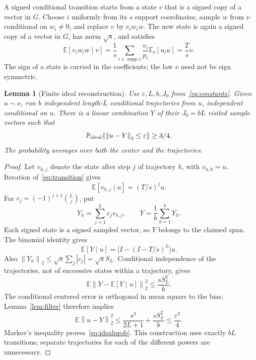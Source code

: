 \documentclass[11pt,a4paper]{article}
\newtheorem{lemma}[theorem]{Lemma}
\theoremstyle{remark}\newtheorem{remark}[theorem]{Remark}
\newcommand{\E}{\mathbb E}
\newcommand{\Prob}{\mathbb P}
\newcommand{\supp}{\operatorname{supp}}
\newcommand{\norm}[1]{\left\lVert #1\right\rVert}
\begin{document}
A signed conditional transition starts from a state $v$ that is a signed copy of a vector in $G$. Choose $i$ uniformly from its $s$ support coordinates, sample $w$ from $\nu$ conditional on $w_i\ne0$, and replace $v$ by $v_iw_iw$. The new state is again a signed copy of a vector in $G$, has norm $\sqrt{s}$, and satisfies
\begin{equation}\label{eq:transition}
 \E[v_iw_iw\mid v]
 =\frac1s\sum_{i\in\supp v}\frac{v_i}{p_i}\E_\nu[u_iu]
 =\frac{T}{s}v.
\end{equation}
The sign of a state is carried in the coefficients; the law $\nu$ need not be sign symmetric.

\begin{lemma}[Finite ideal reconstruction]\label{lem:ideal}
Use $\varepsilon,L,b,J_0$ from~\eqref{eq:constants}. Given $u\sim\nu$, run $b$ independent length-$L$ conditional trajectories from $u$, independent conditional on $u$. There is a linear combination $Y$ of their $J_0=bL$ visited sample vectors such that
\begin{equation}\label{eq:idealprob}
 \Prob_{\rm ideal}\{\norm{u-Y}_2\le\varepsilon\}\ge3/4.
\end{equation}
The probability averages over both the center and the trajectories.
\end{lemma}
\begin{proof}
Let $v_{h,j}$ denote the state after step $j$ of trajectory $h$, with $v_{h,0}=u$. Iteration of~\eqref{eq:transition} gives
\[
 \E[v_{h,j}\mid u]=(T/s)^ju.
\]
For $c_j=(-1)^{j+1}\binom Lj$, put
\[
 Y_h=\sum_{j=1}^Lc_jv_{h,j},\qquad Y=\frac1b\sum_{h=1}^bY_h.
\]
Each signed state is a signed sampled vector, so $Y$ belongs to the claimed span. The binomial identity gives
\[
 \E[Y\mid u]=\big[I-(I-T/s)^L\big]u.
\]
Also $\norm{Y_h}_2\le\sqrt{s}\sum_j|c_j|=\sqrt{s}S_L$. Conditional independence of the trajectories, not of successive states within a trajectory, gives
\[
 \E\norm{Y-\E[Y\mid u]}_2^2\le\frac{sS_L^2}{b}.
\]
The conditional centered error is orthogonal in mean square to the bias. Lemma~\ref{lem:filter} therefore implies
\begin{equation}\label{eq:idealerror}
 \E\norm{u-Y}_2^2
 \le\frac{s^2}{2L+1}+\frac{sS_L^2}{b}
 \le\frac{\varepsilon^2}{4}.
\end{equation}
Markov's inequality proves~\eqref{eq:idealprob}. This construction uses exactly $bL$ transitions; separate trajectories for each of the different powers are unnecessary.
\end{proof}
\end{document}
